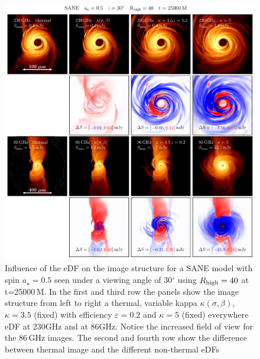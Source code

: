 \begin{figure}[t!]
  \centering
  \includegraphics[width=\textwidth]{./figures/SANE_eDFs_diff.pdf}
  \caption{Influence of the eDF on the image structure for a SANE model with spin $a_{\star}=0.5$ seen under a viewing angle of 30$^\circ$ using $R_{\rm high}=40$ at t=25000\,M. In the first and third row the panels show the image structure from left to right a thermal, variable kappa $\kappa(\sigma,\beta)$, $\kappa=3.5$ (fixed) with efficiency $\varepsilon=0.2$ and $\kappa=5$ (fixed) everywhere eDF at 230GHz and at 86GHz. Notice the increased field of view for the 86\,GHz images. The second and fourth row show the difference between thermal image and the different non-thermal eDFs}
  \label{fig:SANE_edfs}
\end{figure}


